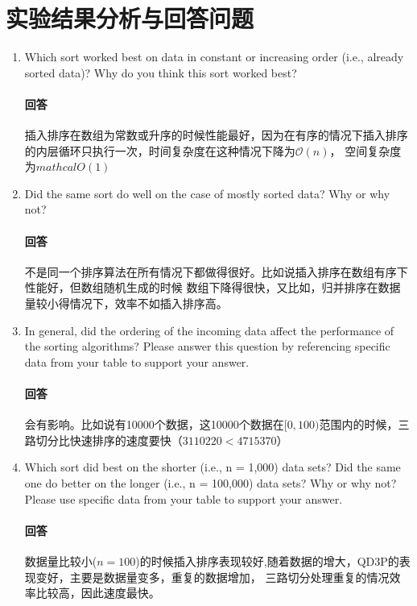 \documentclass[12pt,a4paper]{ctexart}
\begin{document}
\section{实验结果分析与回答问题}
\begin{enumerate}
    \item Which sort worked best on data in constant or increasing order (i.e., already sorted data)? Why do you think
          this sort worked best?
          \paragraph{回答}
          插入排序在数组为常数或升序的时候性能最好，因为在有序的情况下插入排序的内层循环只执行一次，时间复杂度在这种情况下降为$\mathcal{O}(n)$，
          空间复杂度为$mathcal{O}(1)$
    \item Did the same sort do well on the case of mostly sorted data? Why or why not?
          \paragraph{回答}
          不是同一个排序算法在所有情况下都做得很好。比如说插入排序在数组有序下性能好，但数组随机生成的时候
          数组下降得很快，又比如，归并排序在数据量较小得情况下，效率不如插入排序高。

    \item In general, did the ordering of the incoming data affect the performance of the sorting algorithms? Please
          answer this question by referencing specific data from your table to support your answer.

          \paragraph{回答} 会有影响。比如说有10000个数据，这10000个数据在$[0,100)$范围内的时候，三路切分比快速排序的速度要快（$3110220<4715370$）


    \item  Which sort did best on the shorter (i.e., n = 1,000) data sets? Did the same one do better on the longer (i.e.,
          n = 100,000) data sets? Why or why not? Please use specific data from your table to support your answer.

          \paragraph{回答}
          数据量比较小($n=100$)的时候插入排序表现较好,随着数据的增大，QD3P的表现变好，主要是数据量变多，重复的数据增加，
          三路切分处理重复的情况效率比较高，因此速度最快。
          

\end{enumerate}
\end{document}
